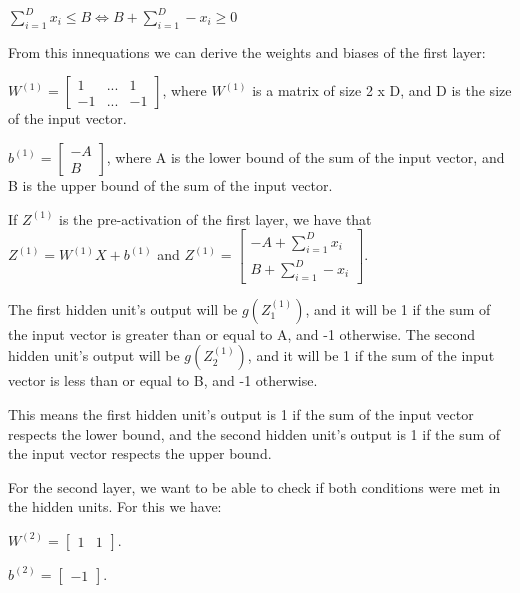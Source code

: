 \documentclass{article}
\begin{document}
\bigskip

$ \sum_{i=1}^{D} x_i \leq B \iff B + \sum_{i=1}^{D}- x_i \geq 0$

\bigskip

From this innequations we can derive the weights and biases of the first layer:

\bigskip

\( W^{(1)} = \begin{bmatrix}
    1  & ... & 1  \\
    -1 & ... & -1
\end{bmatrix}
\), where \(W^{(1)}\) is a matrix of size 2 x D, and D is the size of the input vector.

\(b^{(1)} = \begin{bmatrix}
    -A \\
    B
\end{bmatrix}
\), where A is the lower bound of the sum of the input vector, and B is the upper bound of the sum of the input vector. 

\bigskip

If $Z^{(1)}$ is the pre-activation of the first layer, we have that $Z^{(1)} = W^{(1)}X + b^{(1)}$ and
$Z^{(1)} = \begin{bmatrix}
    -A + \sum_{i=1}^{D} x_i\\
    B + \sum_{i=1}^{D}- x_i
\end{bmatrix}
$.

\bigskip

The first hidden unit's output will be $g(Z^{(1)}_1)$, and it will be 1 if the sum of the input vector is greater than or equal to A, 
and -1 otherwise.
The second hidden unit's output will be $g(Z^{(1)}_2)$, and it will be 1 if the sum of the input vector is less than or equal to B, 
and -1 otherwise.

This means the first hidden unit's output is 1 if the sum of the input vector respects the lower bound, 
and the second hidden unit's output is 1 if the sum of the input vector respects the upper bound.

For the second layer, we want to be able to check if both conditions were met in the hidden units. For this we have:

\bigskip

\( W^{(2)} = \begin{bmatrix}
    1 & 1
\end{bmatrix}
\).

\medskip

\(b^{(2)} = \begin{bmatrix}
    -1
\end{bmatrix}
\).
\end{document}
